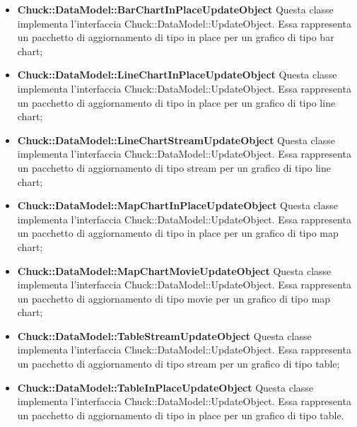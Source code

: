 \begin{itemize}
		\item \textbf{Chuck::DataModel::BarChartInPlaceUpdateObject} Questa classe implementa l'interfaccia Chuck::DataModel::UpdateObject. Essa rappresenta un pacchetto di aggiornamento di tipo in place per un grafico di tipo bar chart;

		\item \textbf{Chuck::DataModel::LineChartInPlaceUpdateObject} Questa classe implementa l'interfaccia Chuck::DataModel::UpdateObject. Essa rappresenta un pacchetto di aggiornamento di tipo in place per un grafico di tipo line chart;

		\item \textbf{Chuck::DataModel::LineChartStreamUpdateObject} Questa classe implementa l'interfaccia Chuck::DataModel::UpdateObject. Essa rappresenta un pacchetto di aggiornamento di tipo stream per un grafico di tipo line chart;

		\item \textbf{Chuck::DataModel::MapChartInPlaceUpdateObject} Questa classe implementa l'interfaccia Chuck::DataModel::UpdateObject. Essa rappresenta un pacchetto di aggiornamento di tipo in place per un grafico di tipo map chart;

		\item \textbf{Chuck::DataModel::MapChartMovieUpdateObject} Questa classe implementa l'interfaccia Chuck::DataModel::UpdateObject. Essa rappresenta un pacchetto di aggiornamento di tipo movie per un grafico di tipo map chart;

		\item \textbf{Chuck::DataModel::TableStreamUpdateObject} Questa classe implementa l'interfaccia Chuck::DataModel::UpdateObject. Essa rappresenta un pacchetto di aggiornamento di tipo stream per un grafico di tipo table;

		\item \textbf{Chuck::DataModel::TableInPlaceUpdateObject} Questa classe implementa l'interfaccia Chuck::DataModel::UpdateObject. Essa rappresenta un pacchetto di aggiornamento di tipo in place per un grafico di tipo table.
	\end{itemize}